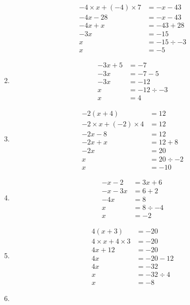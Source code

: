 \documentclass[11pt]{article}
\begin{document}
\begin{multicols}{3}
\begin{enumerate}
\begin{align*}
       -4 \times x + (-4) \times 7 &= -x - 43 \\
       -4x - 28 &= -x - 43\\
       -4x + x &= -43 + 28 \\
       -3x &= -15 \\
       x &= -15 \div -3\\
       x &= -5         
    \end{align*}
    \item
    \begin{align*}
        -3x + 5 &= -7 \\
        -3x &= -7 - 5  \\
        -3x &= -12  \\
        x &= -12 \div -3 \\
        x &= 4    
    \end{align*}
    \item
    \begin{align*}
       -2(x + 4) &= 12 \\
       -2 \times x + (-2) \times 4 &= 12 \\
       -2x - 8 &= 12\\
       -2x + x &= 12 + 8 \\
       -2x &= 20 \\
       x &= 20 \div -2\\
       x &= -10         
    \end{align*}
    \item
    \begin{align*}
       -x - 2 &= 3x + 6 \\
       -x -3x &= 6 + 2  \\
       -4x &= 8  \\
        x &= 8 \div -4 \\
        x &= -2          
    \end{align*}
    \item
    \begin{align*}
       4(x + 3) &= -20 \\
       4 \times x + 4 \times 3 &= -20 \\
       4x + 12 &= -20\\
       4x &= -20 - 12 \\
       4x &= -32 \\
       x &= -32 \div 4\\
       x &= -8
    \end{align*}
    \item
    \begin{align*}

\end{align*}
\end{enumerate}
\end{multicols}
\end{document}
